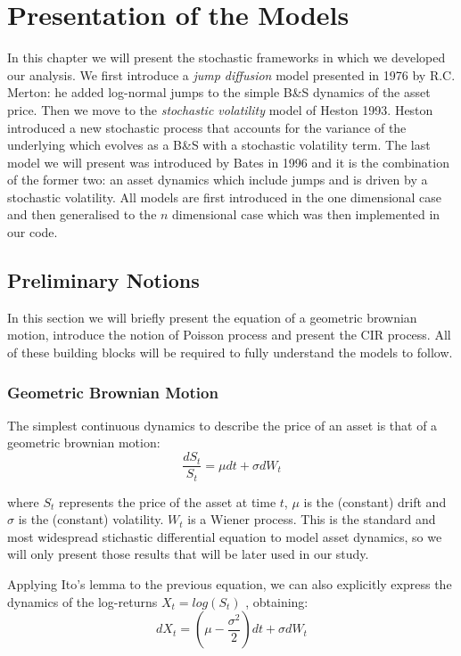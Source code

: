 \chapter{Presentation of the Models}
\label{chpr:models}
In this chapter we will present the stochastic frameworks in which we developed our analysis. We first introduce a \textit{jump diffusion} model presented in 1976 by R.C. Merton: he added log-normal jumps to the simple B\&S dynamics of the asset price. Then we move to the \textit{stochastic volatility} model of Heston 1993. Heston introduced a new stochastic process that accounts for the variance of the underlying which evolves as a B\&S  with a stochastic volatility term.
The last model we will present was introduced by Bates in 1996 and it is the combination of the former two: an asset dynamics which include jumps and is driven by a stochastic volatility.
All models are first introduced in the one dimensional case and then generalised to the $n$ dimensional case which was then implemented in our code.

\bigskip

\section{Preliminary Notions}

In this section we will briefly present the equation of a geometric brownian motion, introduce the notion of Poisson process and present the 
CIR process. All of these building blocks will be required to fully understand the models to follow.


\subsection{Geometric Brownian Motion}
The simplest continuous dynamics to describe the price of an asset is that of a geometric brownian motion:
\begin{equation}
	\label{GBM_eq}
	\frac{dS_t}{S_t} = \mu dt + \sigma dW_t
\end{equation}

where $S_t$ represents the price of the asset at time $t$, $\mu$ is the (constant) drift and $\sigma$ is the (constant) volatility. $W_t$ is a Wiener process.
This is the standard and most widespread stichastic differential equation to model asset dynamics, so we will only present those results that will be later used in our study.


Applying Ito's lemma to the previous equation, we can also explicitly express the dynamics of the log-returns $X_t = log(S_t)$ , obtaining:
\begin{equation}
	dX_t = (\mu - 	\frac{\sigma^2}{2}) dt + \sigma dW_t
\end{equation}

